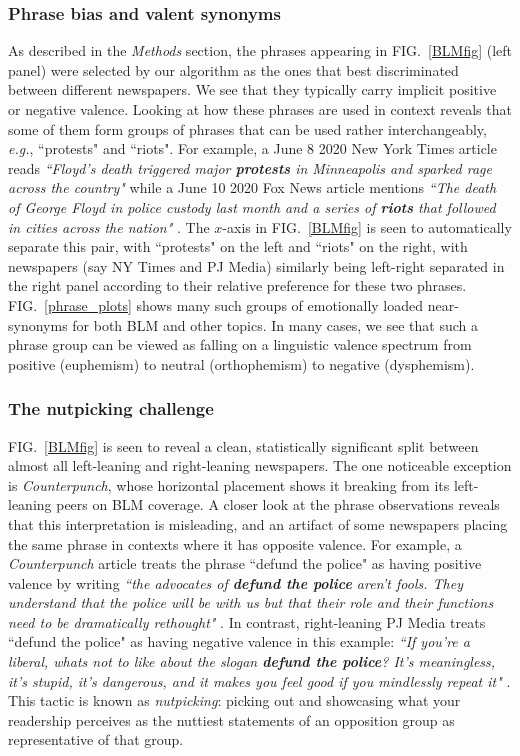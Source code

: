 \documentclass[10pt,letterpaper]{article}
\def\eg{{\frenchspacing\it e.g.}}
\def\Fig#1{FIG.~\ref{#1}}
\begin{document}
\subsubsection*{Phrase bias and valent synonyms}

As described in the {\it Methods} section, the phrases appearing in  \Fig{BLMfig} (left panel) were selected by our algorithm as the ones that best discriminated between different newspapers. We see that they typically carry implicit positive or negative valence. 
Looking at how these phrases are used in context reveals that some of them form groups of phrases that can be used
rather interchangeably, \eg, ``protests" and ``riots".
For example, a June 8 2020 New York Times article reads 
{\it ``Floyd's death triggered major \textbf{protests} in Minneapolis and sparked rage across the country"} \cite{nyt_george} while a June 10 2020 Fox News article mentions {\it ``The death of George Floyd in police custody last month and a series of \textbf{riots} that followed in cities across the nation" } \cite{noauthor_george_nodate}.
The $x$-axis in \Fig{BLMfig} is seen to automatically separate this pair, with ``protests" on the left and ``riots" on the right, with newspapers (say NY Times and PJ Media) similarly being left-right separated in the right panel according to their relative preference for these two phrases. 
\Fig{phrase_plots} shows many such groups of emotionally loaded near-synonyms for both BLM and other topics.
In many cases, we see that such a phrase group can be viewed as falling on a linguistic valence spectrum from positive  (euphemism) to neutral (orthophemism) to negative (dysphemism).



\subsubsection*{The nutpicking challenge}

\Fig{BLMfig} is seen to reveal a clean, statistically significant split between almost all left-leaning and right-leaning newspapers. The one noticeable exception is {\it Counterpunch}, whose horizontal placement shows it breaking from its left-leaning peers on BLM coverage. 
A closer look at the phrase observations reveals that this interpretation is misleading, and an artifact of some newspapers placing the same phrase in contexts where it has opposite valence. 
For example, a {\it Counterpunch} article treats the phrase ``defund the police" as having positive valence by writing 
{\it ``the advocates of \textbf{defund the police} aren't fools. They understand that the police will be with us but that their role and their functions need to be dramatically rethought"} \cite{noauthor_police_2020}.
In contrast, right-leaning PJ Media  treats ``defund the police" as having negative valence in this example:
{\it ``If you're a liberal, whats not to like about the slogan \textbf{defund the police}? It's meaningless, it's stupid, it's dangerous, and it makes you feel good if you mindlessly repeat it"} \cite{moran_bloody_nodate}. 
This tactic is known as {\it nutpicking}: picking out and showcasing what your readership perceives as the nuttiest statements of an opposition group as representative of that group. 
\end{document}
